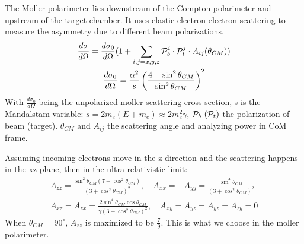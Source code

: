 The Moller polarimeter lies downstream of the Compton polarimeter and upstream 
of the target chamber. It uses elastic electron-electron scattering to measure the
asymmetry due to different beam polarizations. 
\begin{equation}
    \begin{gathered}
	\frac{d\sigma}{d\Omega} = \frac{d\sigma_0}{d\Omega} (1 + \sum_{i,j=x,y,z} \mathcal{P}_b^i \cdot \mathcal{P}_t^j \cdot A_{ij}(\theta_{CM})) \\
	\frac{d\sigma_0}{d\Omega} = \frac{\alpha^2}{s} \left( \frac{4 - \sin^2\theta_{CM}}{\sin^2\theta_{CM}}\right)^2 
    \end{gathered}
    \label{eq:moller_xsection}
\end{equation}
With $\frac{d\sigma_0}{d\Omega}$ being the unpolarized moller scattering cross section,
s is the Mandalstam variable: $s = 2m_e(E+m_e) \approx 2m_e^2\gamma$,
$\mathcal{P}_b \ (\mathcal{P}_t)$ the polarization of beam (target). 
$\theta_{CM}$ and $A_{ij}$ the scattering angle and analyzing power in CoM frame. 

Assuming incoming electrons move in the z direction and the scattering happens
in the xz plane, then in the ultra-relativistic limit:
\begin{equation}
    \begin{gathered}
	A_{zz} = \frac{\sin^2\theta_{CM} (7 + \cos^2\theta_{CM})}{(3+\cos^2\theta_{CM})^2},
	\quad
	A_{xx} = -A_{yy} = \frac{\sin^4\theta_{CM}}{(3+\cos^2\theta_{CM})^2}	\\
	A_{xz} = A_{zx} = \frac{2\sin^4\theta_{CM}\cos\theta_{CM}}{\gamma(3+\cos^2\theta_{CM})^2},
	\quad
	A_{xy} = A_{yz} = A_{yz} = A_{zy} = 0
    \end{gathered}
\end{equation}
When $\theta_{CM} = 90^\circ$, $A_{zz}$ is maximized to be $\frac{7}{9}$. This
is what we choose in the moller polarimeter.

